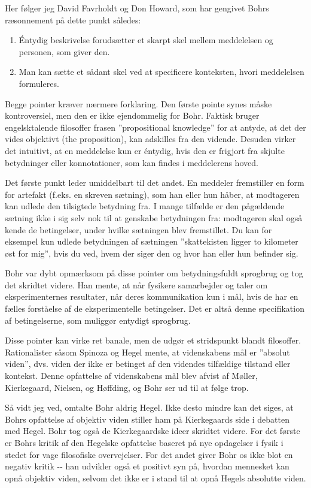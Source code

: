 \documentclass[12pt]{article}
\begin{document}
Her følger jeg David Favrholdt og Don Howard, som har gengivet Bohrs
ræsonnement på dette punkt således:

\begin{enumerate}
\def\labelenumi{\arabic{enumi}.}
\item
  Éntydig beskrivelse forudsætter et skarpt skel mellem meddelelsen og
  personen, som giver den.
\item
  Man kan sætte et sådant skel ved at specificere konteksten, hvori
  meddelelsen formuleres.
\end{enumerate}

Begge pointer kræver nærmere forklaring. Den første pointe synes måske
kontroversiel, men den er ikke ejendommelig for Bohr. Faktisk bruger
engelsktalende filosoffer frasen ''propositional knowledge'' for at
antyde, at det der vides objektivt (the proposition), kan adskilles fra
den vidende. Desuden virker det intuitivt, at en meddelelse kun er
éntydig, hvis den er frigjort fra skjulte betydninger eller
konnotationer, som kan findes i meddelerens hoved.

Det første punkt leder umiddelbart til det andet. En meddeler
fremstiller en form for artefakt (f.eks. en skreven sætning), som han
eller hun håber, at modtageren kan udlede den tilsigtede betydning fra.
I mange tilfælde er den pågældende sætning ikke i sig selv nok til at
genskabe betydningen fra: modtageren skal også kende de betingelser,
under hvilke sætningen blev fremstillet. Du kan for eksempel kun udlede
betydningen af sætningen ''skattekisten ligger to kilometer øst for
mig'', hvis du ved, hvem der siger den og hvor han eller hun befinder
sig.

Bohr var dybt opmærksom på disse pointer om betydningsfuldt sprogbrug og
tog det skridtet videre. Han mente, at når fysikere samarbejder og taler
om eksperimenternes resultater, når deres kommunikation kun i mål, hvis
de har en fælles forståelse af de eksperimentelle betingelser. Det er
altså denne specifikation af betingelserne, som muliggør entydigt
sprogbrug.

Disse pointer kan virke ret banale, men de udgør et stridspunkt blandt
filosoffer. Rationalister såsom Spinoza og Hegel mente, at videnskabens
mål er ''absolut viden'', dvs. viden der ikke er betinget af den
videndes tilfældige tilstand eller kontekst. Denne opfattelse af
videnskabens mål blev afvist af Møller, Kierkegaard, Nielsen, og
Høffding, og Bohr ser ud til at følge trop.

Så vidt jeg ved, omtalte Bohr aldrig Hegel. Ikke desto mindre kan det
siges, at Bohrs opfattelse af objektiv viden stiller ham på Kierkegaards
side i debatten med Hegel. Bohr tog også de Kierkegaardske ideer
skridtet videre. For det første er Bohrs kritik af den Hegelske
opfattelse baseret på nye opdagelser i fysik i stedet for vage
filosofiske overvejelser. For det andet giver Bohr os ikke blot en
negativ kritik -\/- han udvikler også et positivt syn på, hvordan
mennesket kan opnå objektiv viden, selvom det ikke er i stand til at
opnå Hegels absolutte viden.
\end{document}
